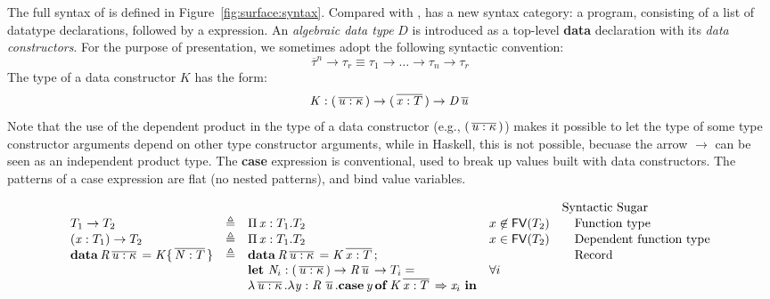 The full syntax of \sufcc is defined in Figure~\ref{fig:surface:syntax}. Compared with \name, \sufcc has a new syntax category: a program, consisting of a list of datatype declarations, followed by a expression. An \emph{algebraic data type} $D$ is introduced as a top-level \textbf{data} declaration with its \emph{data constructors}. For the purpose of presentation, we sometimes adopt the following syntactic convention:
\[
\overline{\tau}^n \rightarrow \tau_r \equiv \tau_1 \rightarrow \dots \rightarrow \tau_n \rightarrow \tau_r
\]
The type of a data constructor $K$ has the form:
\[
\ottmv{K}  \ottsym{:}  \ottsym{(}  \,\overline{  \ottnt{u}  \ottsym{:}  \kappa  }\,  \ottsym{)}  \rightarrow  \ottsym{(}  \,\overline{  \ottmv{x}  \ottsym{:}  T  }\,  \ottsym{)}  \rightarrow  \ottmv{D}    \,\overline{  \ottnt{u}  }\,
\]
 
Note that the use of the dependent product in the type of a data
constructor (e.g., $\ottsym{(}  \,\overline{  \ottnt{u}  \ottsym{:}  \kappa  }\,  \ottsym{)}$) makes it possible to let the type
of some type constructor arguments depend on other type constructor
arguments, while in Haskell, this is not possible, becuase the arrow
$\rightarrow$ can be seen as an independent product type. The
\textbf{case} expression is conventional, used to break up values
built with data constructors.  The patterns of a case expression are
flat (no nested patterns), and bind value variables.

\begin{figure*}
\centering
\gram{\ottpgm\ottinterrule
\ottdecl\ottinterrule
\ottu\ottinterrule
\ottp\ottinterrule
\ottE\ottinterrule
\ottGs}
\[\ottsurfsugar\] %
\caption{Syntax of the surface language}
\label{fig:surface:syntax}
\end{figure*}


